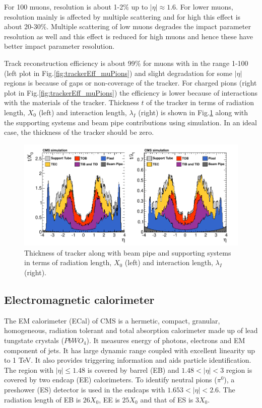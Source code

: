 For 100 \gev muons, \pt resolution is about 1-2\% up to $|\eta| \approx 1.6$. For lower \pt muons, resolution mainly is affected by multiple scattering and for high \pt this effect is about 20-30\%. Multiple scattering of low \pt muons degrades the impact parameter resolution as well and this effect is reduced for high \pt muons and hence these have better impact parameter resolution.

Track reconstruction efficiency is about 99\% for muons with \pt in the range 1-100 \gev (left plot in Fig.\ref{fig:trackerEff_muPions}) and slight degradation for some $|\eta|$ regions is because of gaps or non-coverage of the tracker. For charged pions (right plot in Fig.\ref{fig:trackerEff_muPions}) the efficiency is lower because of interactions with the materials of the tracker. Thickness $t$ of the tracker in terms of radiation length, $X_0$ (left) and interaction length, $\lambda_I$ (right) is shown in Fig.\ref{fig:tracker_material} along with the supporting systems and beam pipe contributions using simulation. In an ideal case, the thickness of the tracker should be zero.

\begin{figure}[h!]
\centering
\includegraphics[width=0.98\linewidth]{../Figures/Chap2/tracker_material}
\caption[Tracker material budget]{Thickness of tracker along with beam pipe and supporting systems in terms of radiation length, $X_0$ (left) and interaction length, $\lambda_I$ (right).}
\label{fig:tracker_material}
\end{figure}

\subsection{Electromagnetic calorimeter}
The EM calorimeter (ECal) of CMS is a hermetic, compact, granular, homogeneous, radiation tolerant and total absorption calorimeter made up of lead tungstate crystals ($PbWO_4$). It measures energy of photons, electrons and EM component of jets. It has large dynamic range coupled with excellent linearity up to 1 TeV. It also provides triggering information and aids particle identification. The region with $|\eta| \leq 1.48$ is covered by barrel (EB) and $1.48 < |\eta| < 3$ region is covered by two endcap (EE) calorimeters. To identify neutral pions ($\pi^0$), a preshower (ES) detector is used in the endcaps with $1.653 < |\eta| < 2.6$. The radiation length of EB is $26X_0$, EE is $25X_0$ and that of ES is $3X_0$.

